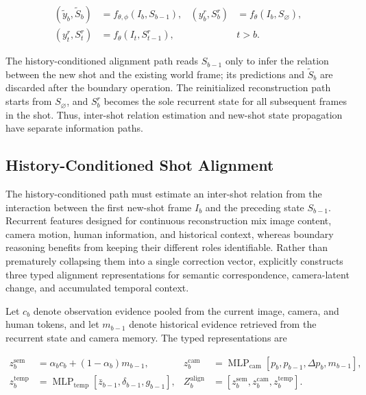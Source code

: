 \begin{equation}
\begin{aligned}
 (\widetilde y_b,\widetilde S_b)&=f_{\theta,\phi}(I_b,S_{b-1}), &
 (y_b^r,S_b^r)&=f_\theta(I_b,S_{\varnothing}),\\
 (y_t^r,S_t^r)&=f_\theta(I_t,S_{t-1}^r), && t>b.
\end{aligned}
\label{eq:boundary-paths}
\end{equation}

The history-conditioned alignment path reads $S_{b-1}$ only to infer the
relation between the new shot and the existing world frame; its predictions
and $\widetilde S_b$ are discarded after the boundary operation. The
reinitialized reconstruction path starts from $S_{\varnothing}$, and $S_b^r$
becomes the sole recurrent state for all subsequent frames in the shot. Thus,
inter-shot relation estimation and new-shot state propagation have separate
information paths.

\subsection{History-Conditioned Shot Alignment}

The history-conditioned path must estimate an inter-shot relation from the
interaction between the first new-shot frame $I_b$ and the preceding state
$S_{b-1}$. Recurrent features designed for continuous reconstruction mix image
content, camera motion, human information, and historical context, whereas
boundary reasoning benefits from keeping their different roles identifiable.
Rather than prematurely collapsing them into a single correction vector,
\method{} explicitly constructs three typed alignment representations for
semantic correspondence, camera-latent change, and accumulated temporal
context.

Let $c_b$ denote observation evidence pooled from the current image, camera,
and human tokens, and let $m_{b-1}$ denote historical evidence retrieved from
the recurrent state and camera memory. The typed representations are

\begin{equation}
\begin{aligned}
 z_b^{\mathrm{sem}}&=\alpha_b c_b+(1-\alpha_b)m_{b-1}, &
 z_b^{\mathrm{cam}}&=\operatorname{MLP}_{\mathrm{cam}}
 [p_b,p_{b-1},\Delta p_b,m_{b-1}],\\
 z_b^{\mathrm{temp}}&=\operatorname{MLP}_{\mathrm{temp}}
 [\bar z_{b-1},\delta_{b-1},g_{b-1}], &
 Z_b^{\mathrm{align}}&=[z_b^{\mathrm{sem}},z_b^{\mathrm{cam}},z_b^{\mathrm{temp}}].
\end{aligned}
\label{eq:alignment-tokens}
\end{equation}


